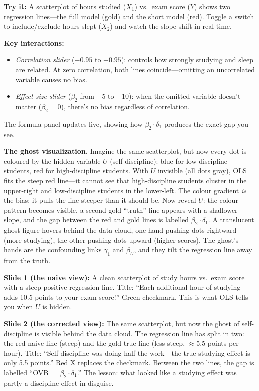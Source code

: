 \documentclass[11pt,a4paper]{article}
\theoremstyle{definition}
\theoremstyle{plain}
\theoremstyle{remark}
\begin{document}
\begin{vizspec}[title={``The Ghost in the Regression'' --- Interactive OVB Explorer}]
\textbf{Try it:} A scatterplot of hours studied ($X_1$) vs.\ exam score ($Y$) shows two regression lines---the full model (gold) and the short model (red). Toggle a switch to include/exclude hours slept ($X_2$) and watch the slope shift in real time.

\textbf{Key interactions:}
\begin{itemize}[nosep]
  \item \emph{Correlation slider} ($-0.95$ to $+0.95$): controls how strongly studying and sleep are related. At zero correlation, both lines coincide---omitting an uncorrelated variable causes no bias.
  \item \emph{Effect-size slider} ($\beta_2$ from $-5$ to $+10$): when the omitted variable doesn't matter ($\beta_2 = 0$), there's no bias regardless of correlation.
\end{itemize}
The formula panel updates live, showing how $\beta_2 \cdot \delta_1$ produces the exact gap you see.

\medskip
\textbf{The ghost visualization.} Imagine the same scatterplot, but now every dot is coloured by the hidden variable $U$ (self-discipline): \textcolor{olsblue}{blue} for low-discipline students, \textcolor{biasred}{red} for high-discipline students. With $U$ invisible (all dots gray), OLS fits the steep red line---it cannot see that high-discipline students cluster in the upper-right and low-discipline students in the lower-left. The colour gradient \emph{is} the bias: it pulls the line steeper than it should be. Now reveal $U$: the colour pattern becomes visible, a second \textcolor{truthgold}{gold} ``truth'' line appears with a shallower slope, and the gap between the red and gold lines is labelled $\beta_2 \cdot \delta_1$. A translucent ghost figure hovers behind the data cloud, one hand pushing dots rightward (more studying), the other pushing dots upward (higher scores). The ghost's hands are the confounding links $\gamma_1$ and $\beta_U$, and they tilt the regression line away from the truth.
\end{vizspec}

\begin{keyinsight}[title={Before and After: The OVB Reveal}]
\textbf{Slide 1 (the naive view):} A clean scatterplot of study hours vs.\ exam score with a steep positive regression line. Title: ``Each additional hour of studying adds 10.5 points to your exam score!'' Green checkmark. This is what OLS tells you when $U$ is hidden.

\medskip
\textbf{Slide 2 (the corrected view):} The same scatterplot, but now the ghost of self-discipline is visible behind the data cloud. The regression line has split in two: the \textcolor{biasred}{red naive line} (steep) and the \textcolor{truthgold}{gold true line} (less steep, $\approx$5.5 points per hour). Title: ``Self-discipline was doing half the work---the true studying effect is only 5.5 points.'' Red X replaces the checkmark. Between the two lines, the gap is labelled ``OVB $= \beta_2 \cdot \delta_1$.'' The lesson: what looked like a studying effect was partly a discipline effect in disguise.
\end{keyinsight}
\end{document}
